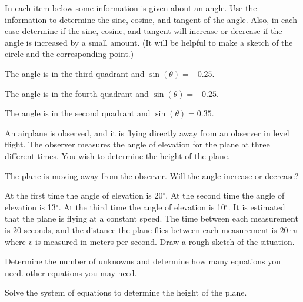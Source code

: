 \begin{problem}
\item In each item below some information is given about an angle.
  Use the information to determine the sine, cosine, and tangent of
  the angle. Also, in each case determine if the sine, cosine, and
  tangent will increase or decrease if the angle is increased by a
  small amount. (It will be helpful to make a sketch of the circle and
  the corresponding point.)
  \begin{subproblem}
  \item The angle is in the third quadrant and $\sin(\theta)=-0.25$.
  \item The angle is in the fourth quadrant and $\sin(\theta)=-0.25$.
  \item The angle is in the second quadrant and $\sin(\theta)=0.35$.
  \end{subproblem}
  \item An airplane is observed, and it is flying directly away from an observer
      in level flight.
      The observer measures the angle of elevation for the plane at three different
      times. You wish to determine the height of the plane.
      \begin{subproblem}
        \item The plane is moving away from the observer. Will the angle increase
          or decrease?
        \item At the first time the angle of elevation is 20$^\circ$.
          At the second time the angle of elevation is 13$^\circ$.
          At the third time the angle of elevation is 10$^\circ$.
          It is estimated that the plane is flying at a constant speed.
          The time between each measurement is 20 seconds, and the distance
          the plane flies between each measurement is $20\cdot v$ where $v$
          is measured in meters per second.
          Draw a rough sketch of the situation.
          \vfill
          \item Determine the number of unknowns and determine how many equations you need.
            \vspace{1em}
          other equations you may need.
          \vfill
        \item Solve the system of equations to determine the height of the plane.
          \vfill
          \vfill
      \end{subproblem}
\end{problem}


